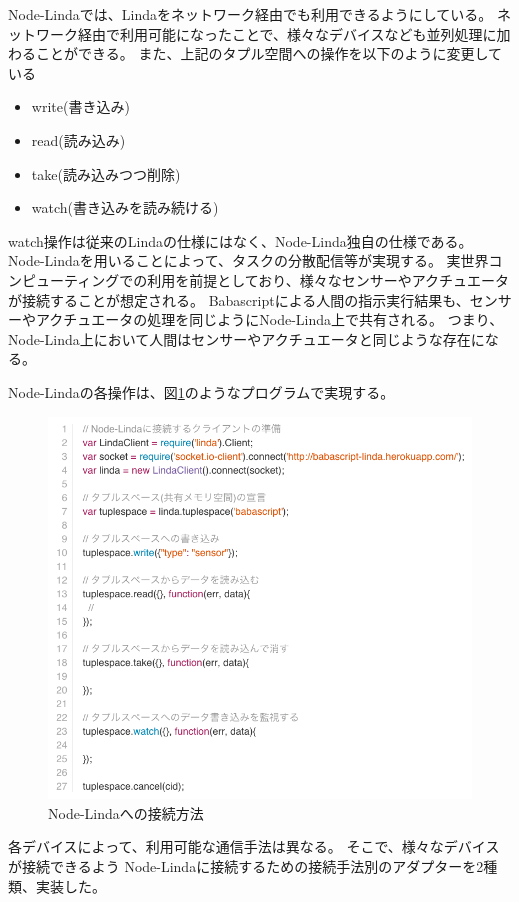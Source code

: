 Node-Lindaでは、Lindaをネットワーク経由でも利用できるようにしている。
ネットワーク経由で利用可能になったことで、様々なデバイスなども並列処理に加わることができる。
また、上記のタプル空間への操作を以下のように変更している

\begin{itemize}
\itemsep1pt\parskip0pt
\item
  write(書き込み)
\item
  read(読み込み)
\item
  take(読み込みつつ削除)
\item
  watch(書き込みを読み続ける)
\end{itemize}

watch操作は従来のLindaの仕様にはなく、Node-Linda独自の仕様である。
Node-Lindaを用いることによって、タスクの分散配信等が実現する。
実世界コンピューティングでの利用を前提としており、様々なセンサーやアクチュエータが接続することが想定される。
Babascriptによる人間の指示実行結果も、センサーやアクチュエータの処理を同じようにNode-Linda上で共有される。
つまり、Node-Linda上において人間はセンサーやアクチュエータと同じような存在になる。

Node-Lindaの各操作は、図\ref{fig:linda-usage}のようなプログラムで実現する。

\begin{figure}[htbp]
  \begin{center}
    \includegraphics[width=.7\linewidth,bb=0 0 770 695]{images/linda-usage.js.png}
  \end{center}
  \caption{Node-Lindaへの接続方法}
  \label{fig:linda-usage}
\end{figure}

各デバイスによって、利用可能な通信手法は異なる。
そこで、様々なデバイスが接続できるよう
Node-Lindaに接続するための接続手法別のアダプターを2種類、実装した。


